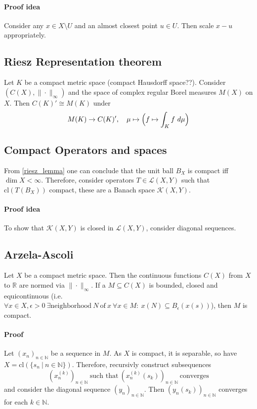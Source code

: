 \documentclass{scrartcl}
\newcommand{\R}{\mathbb{R}}
\newcommand{\N}{\mathbb{N}}
\begin{document}
\paragraph{Proof idea} Consider any $x \in X \setminus U$ and an almost closest point $u \in U$. Then scale $x - u$ appropriately.

\subsection{Riesz Representation theorem}
Let $K$ be a compact metric space (compact Hausdorff space??). Consider $(C(X), \|\cdot\|_\infty)$ and the space of complex regular Borel measures $M(X)$ on $X$. Then $C(K)' \cong M(K)$ under
\begin{equation*}
    M(K) \to C(K)', \quad \mu \mapsto \Bigl(f \mapsto \int_K f \ d\mu\Bigr)
\end{equation*}

\subsection{Compact Operators and spaces}
From \ref{riesz_lemma} one can conclude that the unit ball $B_X$ is compact iff $\dim X < \infty$. Therefore, consider operators $T \in \mathcal{L}(X, Y)$ such that $\mathrm{cl}(T(B_X))$ compact, these are a Banach space $\mathcal{K}(X, Y)$.
\paragraph{Proof idea} To show that $\mathcal{K}(X, Y)$ is closed in $\mathcal{L}(X, Y)$, consider diagonal sequences.

\subsection{Arzela-Ascoli}
\label{arzela_ascoli}
Let $X$ be a compact metric space. Then the continuous functions $C(X)$ from $X$ to $\R$ are normed via $\|\cdot\|_{\infty}$.
If a $M \subseteq C(X)$ is bounded, closed and equicontinuous (i.e. $\forall x \in X, \epsilon > 0 \ \exists \mathrm{neighborhood} \ N \ \mathrm{of} \ x \ \forall x \in M: \ x(N) \subseteq B_{\epsilon}(x(s))$), then $M$ is compact.

\paragraph{Proof} Let $(x_n)_{n \in \N}$ be a sequence in $M$. As $X$ is compact, it is separable, so have $X = \mathrm{cl}(\{ s_n \ | \ n \in \N \})$.
Therefore, recursivly construct subsequences
\begin{equation*}
    \left(x_n^{(k)}\right)_{n \in \N} \ \text{such that} \ \left(x_n^{(k)}(s_k)\right)_{n \in \N} \ \text{converges}
\end{equation*}
and consider the diagonal sequence $(y_n)_{n \in \N}$. Then $(y_n(s_k))_{n \in \N}$ converges for each $k \in \N$.
\end{document}
